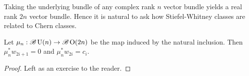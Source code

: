 \documentclass{amsart}
\begin{document}
Taking the underlying bundle of any complex rank $n$ vector bundle yields a real rank $2n$ vector bundle.
Hence it is natural to ask how Stiefel-Whitney classes are related to Chern classes.
\begin{proposition}
    Let $\mu_n:\mathscr{B}\operatorname{U}(n) \to \mathscr{B}\operatorname{O}(2n)$ be the map induced by the natural
    inclusion. Then $\mu_n^*w_{2i+1}=0$ and $\mu_n^*w_{2i}=c_i$.
\end{proposition}
\begin{proof}
    Left as an exercise to the reader.
\end{proof}
\end{document}

